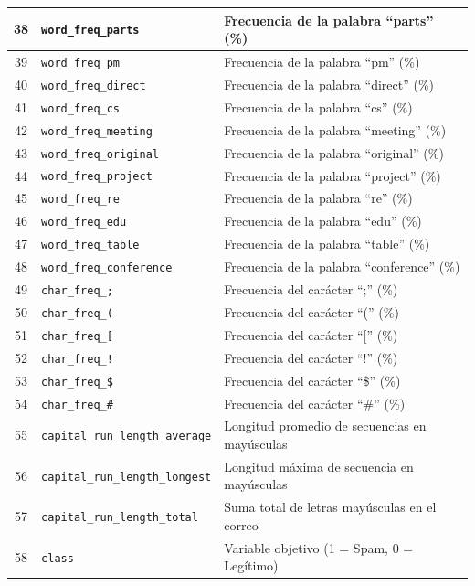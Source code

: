 \documentclass[a4paper,11pt]{book}
\begin{document}
\begin{longtable}{|c|l|l|}
38 & \texttt{word\_freq\_parts} & Frecuencia de la palabra ``parts'' (\%) \\ \hline
39 & \texttt{word\_freq\_pm} & Frecuencia de la palabra ``pm'' (\%) \\ \hline
40 & \texttt{word\_freq\_direct} & Frecuencia de la palabra ``direct'' (\%) \\ \hline
41 & \texttt{word\_freq\_cs} & Frecuencia de la palabra ``cs'' (\%) \\ \hline
42 & \texttt{word\_freq\_meeting} & Frecuencia de la palabra ``meeting'' (\%) \\ \hline
43 & \texttt{word\_freq\_original} & Frecuencia de la palabra ``original'' (\%) \\ \hline
44 & \texttt{word\_freq\_project} & Frecuencia de la palabra ``project'' (\%) \\ \hline
45 & \texttt{word\_freq\_re} & Frecuencia de la palabra ``re'' (\%) \\ \hline
46 & \texttt{word\_freq\_edu} & Frecuencia de la palabra ``edu'' (\%) \\ \hline
47 & \texttt{word\_freq\_table} & Frecuencia de la palabra ``table'' (\%) \\ \hline
48 & \texttt{word\_freq\_conference} & Frecuencia de la palabra ``conference'' (\%) \\ \hline
49 & \texttt{char\_freq\_;} & Frecuencia del carácter ``;'' (\%) \\ \hline
50 & \texttt{char\_freq\_(} & Frecuencia del carácter ``('' (\%) \\ \hline
51 & \texttt{char\_freq\_[} & Frecuencia del carácter ``['' (\%) \\ \hline
52 & \texttt{char\_freq\_!} & Frecuencia del carácter ``!'' (\%) \\ \hline
53 & \texttt{char\_freq\_\$} & Frecuencia del carácter ``\$'' (\%) \\ \hline
54 & \texttt{char\_freq\_\#} & Frecuencia del carácter ``\#'' (\%) \\ \hline
55 & \texttt{capital\_run\_length\_average} & Longitud promedio de secuencias en mayúsculas \\ \hline
56 & \texttt{capital\_run\_length\_longest} & Longitud máxima de secuencia en mayúsculas \\ \hline
57 & \texttt{capital\_run\_length\_total} & Suma total de letras mayúsculas en el correo \\ \hline
58 & \texttt{class} & Variable objetivo (1 = Spam, 0 = Legítimo) \\ 
\end{longtable}
\end{document}
